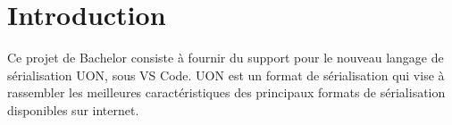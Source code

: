 \documentclass[
    iict, %
    il, %
]{heig-tb}
\begin{document}
\maketitle
\frontmatter
\clearemptydoublepage

\preamble
\let\cleardoublepage\clearpage
\authentification
\let\cleardoublepage\clearpage

\begin{abstract}
    
\end{abstract}

\listoffigures
{}
\listoflistings
{}

\tableofcontents

\printnomenclature
\clearemptydoublepage
{}

\pagestyle{fancy}
\fancyhf{}
\renewcommand\headrulewidth{1pt}

\fancyhead[L]{\itshape\nouppercase{\leftmark}}

\renewcommand{\chaptermark}[1]{\markboth{\MakeUppercase{#1}}{}}

\renewcommand\footrulewidth{1pt}


\renewcommand{\headrulewidth}{0.4pt}
\renewcommand{\footrulewidth}{0.4pt}

\titlespacing{\chapter}{0pt}{-40pt}{20pt}

\mainmatter
\chapter{Introduction}


Ce projet de Bachelor consiste à fournir du support pour le nouveau langage de sérialisation UON, sous VS Code.
UON est un format de sérialisation qui vise à rassembler les meilleures caractéristiques des principaux formats de sérialisation disponibles sur internet.
\end{document}
